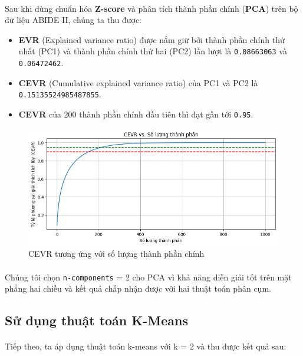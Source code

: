 \paragraph{}{Sau khi dùng chuẩn hóa \textbf{Z-score} và phân tích thành phần chính (\textbf{PCA}) trên bộ dữ liệu ABIDE II, chúng ta thu được:}
\begin{itemize}
    \item \textbf{EVR} (Explained variance ratio) được nắm giữ bởi thành phần chính thứ nhất (PC1) và thành phần chính thứ hai (PC2) lần lượt là \texttt{0.08663063}  và \texttt{0.06472462}.
    \item \textbf{CEVR} (Cumulative explained variance ratio) của PC1 và PC2 là \texttt{0.15135524985487855}.
    \item \textbf{CEVR} của 200 thành phần chính đầu tiên thì đạt gần tới \texttt{0.95}.
\end{itemize}

\begin{figure}[H]
    \centering
    \includegraphics[width=1\linewidth]{img/all_cevr.png}
    \caption{CEVR tương ứng với số lượng thành phần chính}
    \label{fig:all_cevr}
\end{figure}

\paragraph{}{Chúng tôi chọn \texttt{n-components} = 2 cho PCA vì khả năng diễn giải tốt trên mặt phẳng hai chiều và kết quả chấp nhận được với hai thuật toán phân cụm.}

\subsection{Sử dụng thuật toán K-Means}

\paragraph{}{Tiếp theo, ta áp dụng thuật toán k-means với k = 2 và thu được kết quả sau:}

